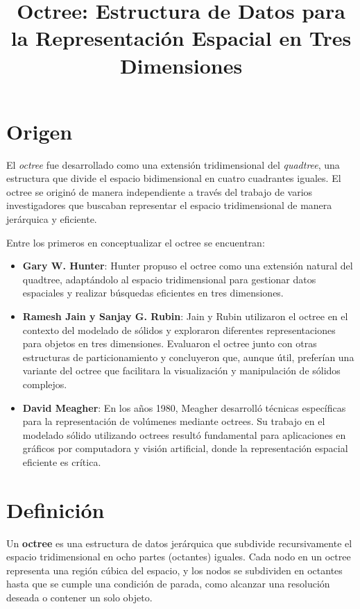 \documentclass{article}
\title{Octree: Estructura de Datos para la Representación Espacial en Tres Dimensiones}
\author{}
\date{}
\begin{document}
\maketitle


\section{Origen}
El \textit{octree} fue desarrollado como una extensión tridimensional del \textit{quadtree}, una estructura que divide el espacio bidimensional en cuatro cuadrantes iguales. El octree se originó de manera independiente a través del trabajo de varios investigadores que buscaban representar el espacio tridimensional de manera jerárquica y eficiente. 

Entre los primeros en conceptualizar el octree se encuentran:
\begin{itemize}
    \item \textbf{Gary W. Hunter}: Hunter propuso el octree como una extensión natural del quadtree, adaptándolo al espacio tridimensional para gestionar datos espaciales y realizar búsquedas eficientes en tres dimensiones.
    \item \textbf{Ramesh Jain y Sanjay G. Rubin}: Jain y Rubin utilizaron el octree en el contexto del modelado de sólidos y exploraron diferentes representaciones para objetos en tres dimensiones. Evaluaron el octree junto con otras estructuras de particionamiento y concluyeron que, aunque útil, preferían una variante del octree que facilitara la visualización y manipulación de sólidos complejos.
    \item \textbf{David Meagher}: En los años 1980, Meagher desarrolló técnicas específicas para la representación de volúmenes mediante octrees. Su trabajo en el modelado sólido utilizando octrees resultó fundamental para aplicaciones en gráficos por computadora y visión artificial, donde la representación espacial eficiente es crítica.
\end{itemize}

\section{Definición}
Un \textbf{octree} es una estructura de datos jerárquica que subdivide recursivamente el espacio tridimensional en ocho partes (octantes) iguales. Cada nodo en un octree representa una región cúbica del espacio, y los nodos se subdividen en octantes hasta que se cumple una condición de parada, como alcanzar una resolución deseada o contener un solo objeto.
\end{document}
